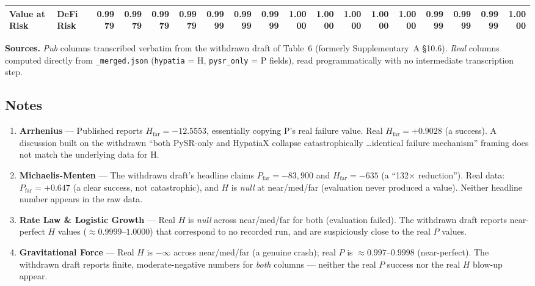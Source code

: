 \documentclass[11pt]{article}
\begin{document}
\begin{landscape}
\begin{adjustbox}{width=\linewidth,center}
\begin{tabular}{l l *{4}{r} *{4}{r} *{4}{r} *{4}{r}}
\textbf{Value at Risk} & DeFi Risk & 0.9979 & 0.9979 & \cellcolor{match}0.9979 & \cellcolor{match}0.9979 & 0.9999 & 0.9999 & \cellcolor{match}0.9999 & \cellcolor{match}1.0000 & 1.0000 & 1.0000 & \cellcolor{match}1.0000 & \cellcolor{match}1.0000 & 0.9999 & 0.9999 & \cellcolor{match}0.9999 & \cellcolor{match}1.0000 \\
\bottomrule
\end{tabular}
\end{adjustbox}

\bigskip

{\small
\textbf{Sources.} \emph{Pub} columns transcribed verbatim from the
withdrawn draft of Table~6 (formerly Supplementary~A \S10.6).
\emph{Real} columns computed directly from \texttt{\_merged.json}
(\texttt{hypatia} = H, \texttt{pysr\_only} = P fields), read
programmatically with no intermediate transcription step.
}

\subsection*{Notes}

\begin{enumerate}
\item \textbf{Arrhenius} --- Published reports $H_{\text{far}} = -12.5553$, essentially copying P's real failure value. Real $H_{\text{far}} = +0.9028$ (a success). A discussion built on the withdrawn ``both PySR-only and HypatiaX collapse catastrophically \ldots identical failure mechanism'' framing does not match the underlying data for H.

\item \textbf{Michaelis-Menten} --- The withdrawn draft's headline claims $P_{\text{far}} = -83{,}900$ and $H_{\text{far}} = -635$ (a ``132$\times$ reduction''). Real data: $P_{\text{far}} = +0.647$ (a clear success, not catastrophic), and $H$ is \textit{null} at near/med/far (evaluation never produced a value). Neither headline number appears in the raw data.

\item \textbf{Rate Law \& Logistic Growth} --- Real $H$ is \textit{null} across near/med/far for both (evaluation failed). The withdrawn draft reports near-perfect $H$ values ($\approx 0.9999$--$1.0000$) that correspond to no recorded run, and are suspiciously close to the real $P$ values.

\item \textbf{Gravitational Force} --- Real $H$ is $-\infty$ across near/med/far (a genuine crash); real $P$ is $\approx 0.997$--$0.9998$ (near-perfect). The withdrawn draft reports finite, moderate-negative numbers for \emph{both} columns --- neither the real $P$ success nor the real $H$ blow-up appear.


\end{enumerate}
\end{landscape}
\end{document}
